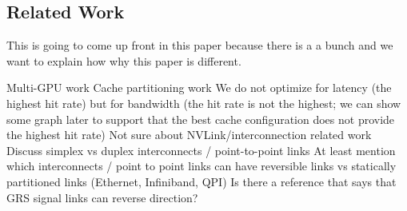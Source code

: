 \subsection{Related Work}

This is going to come up front in this paper because there is a a bunch and we want to explain how
why this paper is different.

Multi-GPU work
Cache partitioning work
We do not optimize for latency (the highest hit rate) but for bandwidth (the hit rate is not the highest; we can show some graph later to support that the best cache configuration does not provide the highest hit rate)
Not sure about NVLink/interconnection related work
Discuss simplex vs duplex interconnects / point-to-point links
At least mention which interconnects / point to point links can have reversible links vs statically partitioned links (Ethernet, Infiniband, QPI)
Is there a reference that says that GRS signal links can reverse direction?


